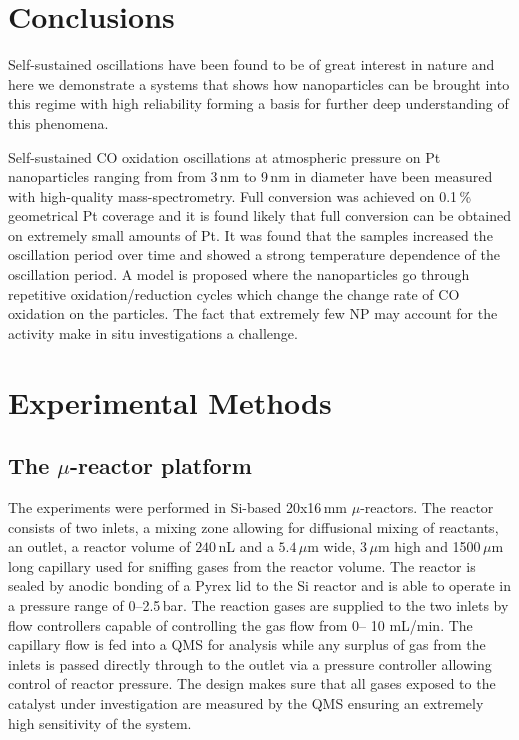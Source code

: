 \documentclass[journal=jacsat,manuscript=article]{achemso}
\begin{document}
\section{Conclusions}
Self-sustained oscillations have been found to be of great interest in nature
and here we demonstrate a systems that shows how nanoparticles can be brought
into this regime with high reliability forming a basis for further deep
understanding of this phenomena.

Self-sustained CO oxidation oscillations at atmospheric pressure on Pt
nanoparticles ranging from from 3\,nm to 9\,nm in diameter have been measured with
high-quality mass-spectrometry. Full conversion was achieved on 0.1\,\%
geometrical Pt coverage and it is found likely that full conversion can be obtained on
extremely small amounts of Pt. It was found that the samples increased the
oscillation period over time and showed a strong temperature dependence of the
oscillation period. A model is proposed where the nanoparticles go through repetitive
oxidation/reduction cycles which change the change rate of CO oxidation on the
particles. The fact that extremely few NP may account for the activity make in
situ investigations a challenge.


\section{Experimental Methods}
\subsection{The $\mu$-reactor platform}
The experiments were performed in Si-based 20x16\,mm
$\mu$-reactors\cite{Henriksen2009}. The reactor consists of two inlets, a
mixing zone allowing for diffusional mixing of reactants, an outlet, a reactor
volume of $240\,$nL and a $5.4\,\mu$m wide, 3\,$\mu$m high and 1500\,$\mu$m
long capillary used for sniffing gases from the reactor volume. The reactor is
sealed by anodic bonding of a Pyrex lid to the Si reactor and is able to
operate in a pressure range of 0--2.5\,bar. The reaction gases are supplied to
the two inlets by flow controllers capable of controlling the gas flow from 0--
10 mL/min. The capillary flow is fed into a QMS
for analysis while any surplus of gas from the inlets is passed directly
through to the outlet via a pressure controller allowing control of reactor
pressure. The design makes sure that all gases exposed to the catalyst under
investigation are measured by the QMS ensuring an extremely high sensitivity of
the system. 
\end{document}
